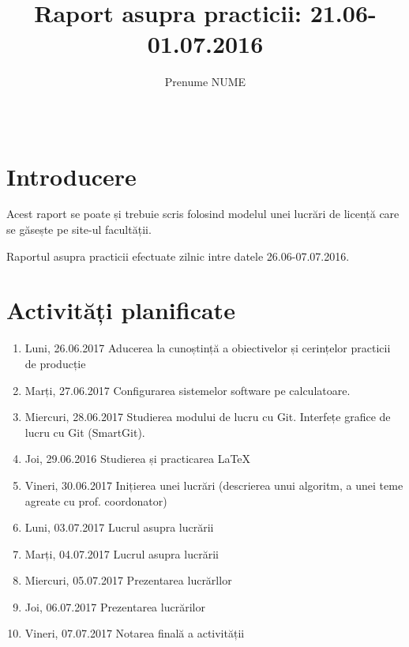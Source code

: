 \documentclass{report}
\title{{\sc Raport asupra practicii: 21.06-01.07.2016}}
\author{Prenume NUME}
\date{\,}
\begin{document}
\maketitle

\tableofcontents

\chapter{Introducere}

Acest raport se poate și trebuie scris folosind modelul unei lucrări de licență care se găsește pe site-ul facultății. 

\vskip 0.5cm

Raportul asupra practicii efectuate zilnic intre datele 26.06-07.07.2016. 

\chapter{Activități planificate}
\begin{enumerate}
\item  Luni, 26.06.2017 \newline
Aducerea la cunoștință a obiectivelor și cerințelor practicii de producție
\item  Marți, 27.06.2017 \newline
Configurarea sistemelor software pe calculatoare. 
\item  Miercuri, 28.06.2017 \newline
Studierea modului de lucru cu Git. Interfețe grafice de lucru cu Git (SmartGit).
\item  Joi, 29.06.2016 \newline
Studierea și practicarea LaTeX
\item  Vineri, 30.06.2017  \newline
Inițierea unei lucrări (descrierea unui algoritm, a unei teme agreate cu prof. coordonator)
\item  Luni, 03.07.2017  \newline
Lucrul asupra lucrării
\item  Marți, 04.07.2017  \newline
Lucrul asupra lucrării
\item  Miercuri, 05.07.2017  \newline
Prezentarea lucrărllor
\item  Joi, 06.07.2017  \newline
Prezentarea lucrărilor
\item  Vineri, 07.07.2017  \newline
Notarea finală a activității
\end{enumerate}
\end{document}
